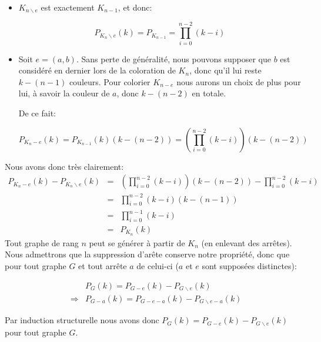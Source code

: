 \begin{itemize}
\item $K_{n\backslash e}$ est exactement $K_{n-1}$, et donc: 

\[ P_{K_n\backslash e}(k) = P_{K_{n-1}} = \prod_{i=0}^{n-2}(k-i) \]


\item Soit $e = (a,b)$. Sans perte de généralité, nous pouvons supposer que $b$ est considéré en dernier lors de la coloration de $K_n$, donc qu'il lui reste $k-(n-1)$ couleurs. Pour colorier $K_{n-e}$ nous aurons un choix de plus pour lui, à savoir la couleur de $a$, donc $k-(n-2)$ en totale. 

De ce fait:

\[ P_{K_n-e}(k) = P_{K_{n-1}}(k)(k-(n-2)) = (\prod_{i=0}^{n-2}(k-i))(k-(n-2)) \]
\end{itemize}

Nous avons donc très clairement:
\begin{eqnarray*}
P_{K_n-e}(k) -  P_{K_n\backslash e}(k) &=& (\prod_{i=0}^{n-2}(k-i))(k-(n-2)) - \prod_{i=0}^{n-2}(k-i)\\
&=& \prod_{i=0}^{n-2}(k-i)(k-(n-1))\\
&=& \prod_{i=0}^{n-1}(k-i)\\
&=& P_{K_n}(k)
\end{eqnarray*}
Tout graphe de rang $n$ peut se générer à partir de $K_n$ (en enlevant des arrêtes). Nous admettrons que la suppression d'arête conserve notre propriété, donc que pour tout graphe $G$ et tout arrête $a$ de celui-ci ($a$ et $e$ sont supposées distinctes):

\begin{eqnarray*}
&&P_G(k) = P_{G-e}(k) - P_{G \backslash e}(k) \\
&\Rightarrow&  P_{G-a}(k) = P_{G-e-a}(k) - P_{G \backslash e-a}(k)
\end{eqnarray*}

Par induction structurelle nous avons donc $P_G(k) = P_{G-e}(k) - P_{G \backslash e}(k)$ pour tout graphe $G$.

